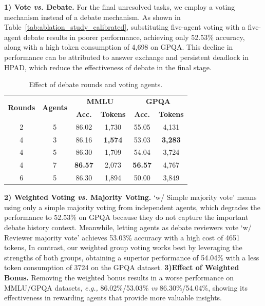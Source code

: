 \documentclass[11pt]{article}
\begin{document}
\textbf{1) Vote \emph{vs.} Debate.} 
For the final unresolved tasks, we employ a voting mechanism instead of a debate mechanism. 
As shown in Table~\ref{tab:ablation_study_calibrated}, substituting five-agent voting with a five-agent debate results in poorer performance, achieving only 52.53\% accuracy, along with a high token consumption of 4,698 on GPQA. 
This decline in performance can be attributed to answer exchange and persistent deadlock in HPAD, which reduce the effectiveness of debate in the final stage. 
\begin{table}
    \centering
\fontsize{9pt}{9.5pt}\selectfont
    
    \setlength{\tabcolsep}{4pt} %
        \caption{Effect of debate rounds and voting agents.}
    \begin{tabular}{c| c | c c | c c}
        \toprule
        \multirow{2}{*}{\textbf{Rounds}} & \multirow{2}{*}{\textbf{Agents}} & \multicolumn{2}{c|}{\textbf{MMLU}} & \multicolumn{2}{c}{\textbf{GPQA}} \\
          & & \textbf{Acc.} & \textbf{Tokens} & \textbf{Acc.} & \textbf{Tokens} \\
        \midrule
        2 & 5 & 86.02 & 1,730 & 55.05 & 4,131 \\
        4 & 3 & 86.16 & \textbf{1,574} & 53.03 & \textbf{3,283} \\
        4 & 5 & {86.30} & 1,709 & 54.04 & 3,724 \\
        4 & 7 & \textbf{86.57} & 2,073 & \textbf{56.57} & 4,767 \\
        6 & 5 & {86.30} & 1,894 & 50.00 & 3,849 \\
        \bottomrule
    \end{tabular}

    \label{tab:scaling_study}
\vspace{-1.0em}
\end{table}
\textbf{2) Weighted Voting \emph{vs.} Majority Voting.}
`w/ Simple majority vote' means using only a simple majority voting from independent agents, which degrades the performance to  52.53\% on GPQA because they do not capture the important debate history context. 
Meanwhile, letting agents as debate reviewers vote `w/ Reviewer majority vote' achieves 53.03\% accuracy with a high cost of 4651 tokens, 
In contrast, our weighted group voting works best by leveraging the strengths of both groups, obtaining a superior performance of 54.04\% with a less token consumption of 3724 on the GPQA dataset. 
\textbf{3)Effect of Weighted Bonus.}
Removing the weighted bonus results in a worse performance on MMLU/GPQA datasets, \emph{e.g.,} 86.02\%/53.03\% \emph{vs} 86.30\%/54.04\%, showing its effectiveness in rewarding agents that provide more valuable insights.
\end{document}
